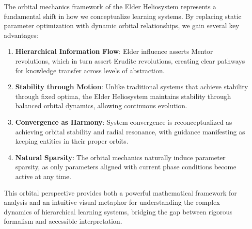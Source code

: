 The orbital mechanics framework of the Elder Heliosystem represents a fundamental shift in how we conceptualize learning systems. By replacing static parameter optimization with dynamic orbital relationships, we gain several key advantages:

\begin{enumerate}
    \item \textbf{Hierarchical Information Flow}: Elder influence asserts Mentor revolutions, which in turn assert Erudite revolutions, creating clear pathways for knowledge transfer across levels of abstraction.
    
    \item \textbf{Stability through Motion}: Unlike traditional systems that achieve stability through fixed optima, the Elder Heliosystem maintains stability through balanced orbital dynamics, allowing continuous evolution.
    
    \item \textbf{Convergence as Harmony}: System convergence is reconceptualized as achieving orbital stability and radial resonance, with guidance manifesting as keeping entities in their proper orbits.
    
    \item \textbf{Natural Sparsity}: The orbital mechanics naturally induce parameter sparsity, as only parameters aligned with current phase conditions become active at any time.
\end{enumerate}

This orbital perspective provides both a powerful mathematical framework for analysis and an intuitive visual metaphor for understanding the complex dynamics of hierarchical learning systems, bridging the gap between rigorous formalism and accessible interpretation.